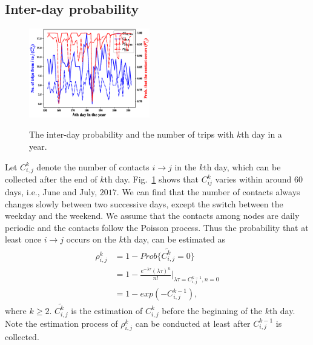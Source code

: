 \subsection{Inter-day probability}
\label{subsec:inter-day}
\begin{figure}
  \centering
  {\includegraphics[width=0.47\textwidth]{fig/interdayprob_P2.eps}}
     \caption{The inter-day probability and the number of trips
     with $k$th day in a year.}
     \label{fig:interdayP}
\end{figure}
Let $C^{k}_{i,j}$ denote the number of contacts $i \rightarrow j$
in the $k$th day,
which can be collected after the end of $k$th day.
Fig.~\ref{fig:interdayP} shows that $C_{ij}^{k}$ varies
within around $60$ days, i.e., June and July, $2017$.
We can find that the number of contacts always changes slowly
between two successive days,
except the switch between the weekday and the weekend.
We assume that the contacts among nodes are daily periodic
and the contacts follow the Poisson process.
Thus the probability that
at least once $i \rightarrow j$ occurs on the $k$th day,
can be estimated as
\begin{equation}
\label{eq:rho}
\begin{aligned}
\rho^{k}_{i,j} &= 1 - Prob\{\widetilde{{C}^{k}_{i,j}}=0\} \\
&= 1 - \frac{e^{-\lambda \tau}(\lambda \tau)^n}{n!} |_{\lambda \tau = {C}^{k-1}_{i,j}, n=0} \\
&= 1 - exp(-C^{k-1}_{i,j}),
\end{aligned}
\end{equation}
where $k \ge 2$.
$\widetilde{{C}^{k}_{i,j}}$ is the estimation of ${C}^{k}_{i,j}$
before the beginning of the $k$th day.
Note the estimation process of $\rho^{k}_{i,j}$ can be conducted
at least after $C^{k-1}_{i,j}$ is collected.

